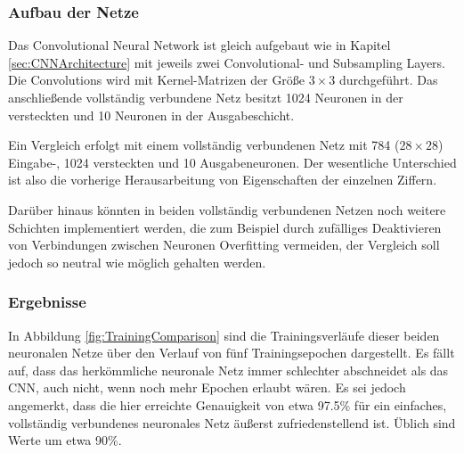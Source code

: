 \documentclass[12pt,a4]{article}
\begin{document}
\subsubsection*{Aufbau der Netze}
Das Convolutional Neural Network ist gleich aufgebaut wie in Kapitel \ref{sec:CNNArchitecture} mit jeweils zwei Convolutional- und Subsampling Layers. Die Convolutions wird mit Kernel-Matrizen der Größe $3 \times 3$ durchgeführt. Das anschließende vollständig verbundene Netz besitzt 1024 Neuronen in der versteckten und 10 Neuronen in der Ausgabeschicht.

Ein Vergleich erfolgt mit einem vollständig verbundenen Netz mit 784 ($28 \times 28$) Eingabe-, 1024 versteckten und 10 Ausgabeneuronen. Der wesentliche Unterschied ist also die vorherige Herausarbeitung von Eigenschaften der einzelnen Ziffern.

Darüber hinaus könnten in beiden vollständig verbundenen Netzen noch weitere Schichten implementiert werden, die zum Beispiel durch zufälliges Deaktivieren von Verbindungen zwischen Neuronen Overfitting vermeiden, der Vergleich soll jedoch so neutral wie möglich gehalten werden.

\subsubsection*{Ergebnisse}
In Abbildung \ref{fig:TrainingComparison} sind die Trainingsverläufe dieser beiden neuronalen Netze über den Verlauf von fünf Trainingsepochen dargestellt. Es fällt auf, dass das herkömmliche neuronale Netz immer schlechter abschneidet als das CNN, auch nicht, wenn noch mehr Epochen erlaubt wären. Es sei jedoch angemerkt, dass die hier erreichte Genauigkeit von etwa 97.5\% für ein einfaches, vollständig verbundenes neuronales Netz äußerst zufriedenstellend ist. Üblich sind Werte um etwa 90\%.
\end{document}
